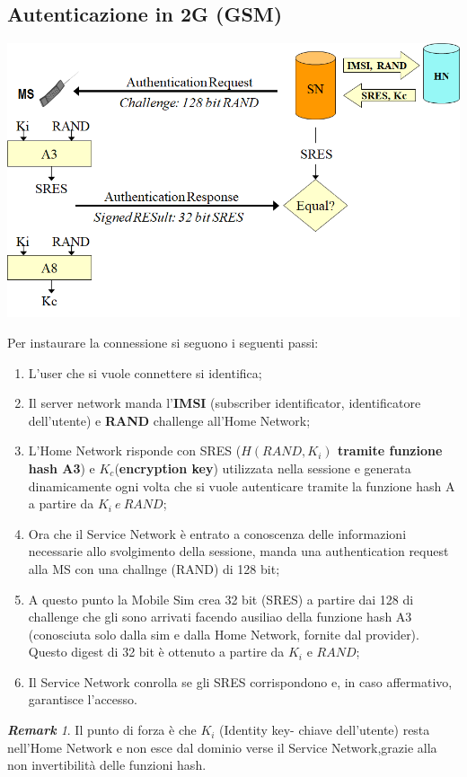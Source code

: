 \documentclass{book}
\theoremstyle{remark}
\newtheorem*{remark}{\textbf{Remark}}
\begin{document}
\subsection{Autenticazione in 2G (GSM)}
\begin{center}
	\includegraphics[scale=0.4]{auth2g.png}
\end{center}
Per instaurare la connessione si seguono i seguenti passi:\begin{enumerate}
	\item L'user che si vuole connettere si identifica;\@
	\item Il server network manda l'\textbf{IMSI} (subscriber identificator, identificatore dell'utente) e \textbf{RAND} challenge all'Home Network;\@
	\item L'Home Network risponde con SRES (\textbf{\(H(RAND,K_i)\) tramite funzione hash A3}) e \(K_c\)(\textbf{encryption key}) utilizzata nella sessione e generata dinamicamente ogni volta che si vuole autenticare tramite la funzione hash A a partire da \(K_i \ e\ RAND\);\@
	\item Ora che il Service Network è entrato a conoscenza delle informazioni necessarie allo svolgimento della sessione, manda una authentication request alla MS con una challnge (RAND) di 128 bit;\@
	\item A questo punto la Mobile Sim crea 32 bit (SRES) a partire dai 128 di challenge che gli sono arrivati facendo ausiliao della funzione hash A3 (conosciuta solo dalla sim e dalla Home Network, fornite dal provider)\@. Questo digest di 32 bit è ottenuto a partire da \(K_i\) e \(RAND\);\@
	\item Il Service Network conrolla se gli SRES corrispondono e, in caso affermativo, garantisce l'accesso\@.
\end{enumerate}
\begin{remark}
	Il punto di forza è che \(K_i\) (Identity key- chiave dell'utente) resta nell'Home Network e non esce dal dominio verse il Service Network,grazie alla non invertibilità delle funzioni hash\@.
\end{remark}
\end{document}
